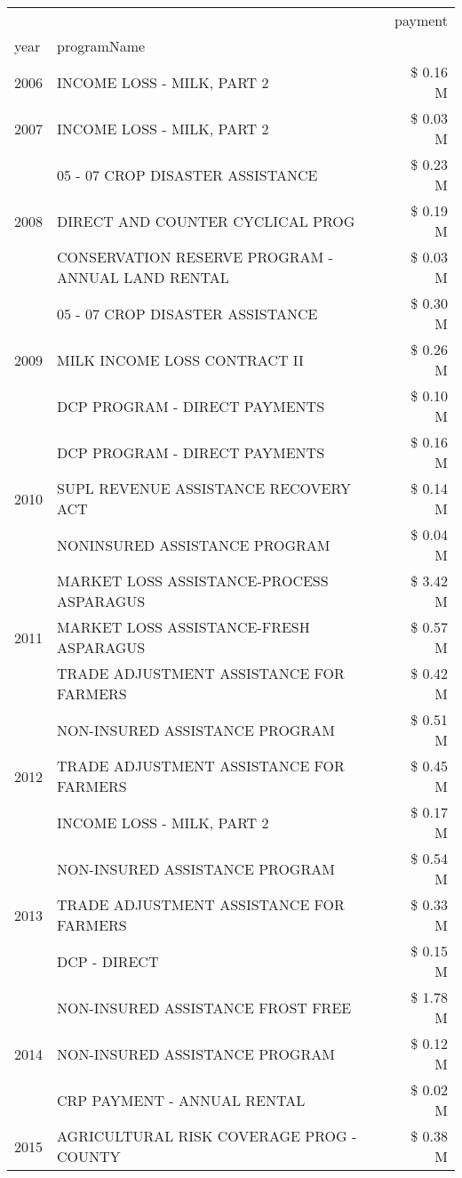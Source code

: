 \begin{tabular}{llr}
\toprule
 &  & payment \\
year & programName &  \\
\midrule
2006 & INCOME LOSS - MILK, PART 2 & \$ 0.16 M \\
\cline{1-3}
2007 & INCOME LOSS - MILK, PART 2 & \$ 0.03 M \\
\cline{1-3}
\multirow[t]{3}{*}{2008} & 05 - 07 CROP DISASTER ASSISTANCE & \$ 0.23 M \\
 & DIRECT AND COUNTER CYCLICAL PROG & \$ 0.19 M \\
 & CONSERVATION RESERVE PROGRAM - ANNUAL LAND RENTAL & \$ 0.03 M \\
\cline{1-3}
\multirow[t]{3}{*}{2009} & 05 - 07 CROP DISASTER ASSISTANCE & \$ 0.30 M \\
 & MILK INCOME LOSS CONTRACT II & \$ 0.26 M \\
 & DCP PROGRAM - DIRECT PAYMENTS & \$ 0.10 M \\
\cline{1-3}
\multirow[t]{3}{*}{2010} & DCP PROGRAM - DIRECT PAYMENTS & \$ 0.16 M \\
 & SUPL REVENUE ASSISTANCE RECOVERY ACT & \$ 0.14 M \\
 & NONINSURED ASSISTANCE PROGRAM & \$ 0.04 M \\
\cline{1-3}
\multirow[t]{3}{*}{2011} & MARKET LOSS ASSISTANCE-PROCESS ASPARAGUS & \$ 3.42 M \\
 & MARKET LOSS ASSISTANCE-FRESH ASPARAGUS & \$ 0.57 M \\
 & TRADE ADJUSTMENT ASSISTANCE FOR FARMERS & \$ 0.42 M \\
\cline{1-3}
\multirow[t]{3}{*}{2012} & NON-INSURED ASSISTANCE PROGRAM & \$ 0.51 M \\
 & TRADE ADJUSTMENT ASSISTANCE FOR FARMERS & \$ 0.45 M \\
 & INCOME LOSS - MILK, PART 2 & \$ 0.17 M \\
\cline{1-3}
\multirow[t]{3}{*}{2013} & NON-INSURED ASSISTANCE PROGRAM & \$ 0.54 M \\
 & TRADE ADJUSTMENT ASSISTANCE FOR FARMERS & \$ 0.33 M \\
 & DCP - DIRECT & \$ 0.15 M \\
\cline{1-3}
\multirow[t]{3}{*}{2014} & NON-INSURED ASSISTANCE FROST FREE & \$ 1.78 M \\
 & NON-INSURED ASSISTANCE PROGRAM & \$ 0.12 M \\
 & CRP PAYMENT - ANNUAL RENTAL & \$ 0.02 M \\
\cline{1-3}
\multirow[t]{3}{*}{2015} & AGRICULTURAL RISK COVERAGE PROG - COUNTY & \$ 0.38 M \\

\end{tabular}

